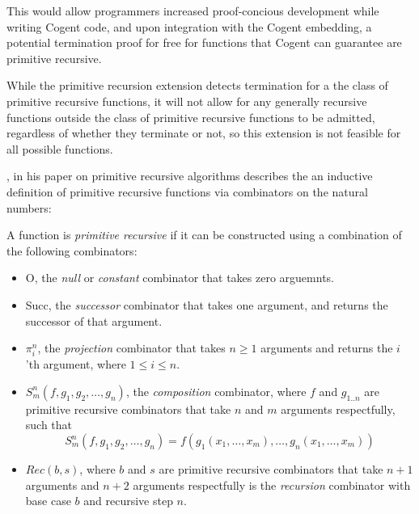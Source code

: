 This would allow programmers increased proof-concious development while writing Cogent code,
and upon integration with the Cogent embedding, a potential termination proof for free for
functions that Cogent can guarantee are primitive recursive.

While the primitive recursion extension detects termination for a the class of primitive recursive functions,
it will not allow for any generally recursive functions outside the class of primitive recursive functions to
be admitted, regardless of whether they terminate or not, so this extension is not feasible for all possible functions.

\citet{AboutPrimrecAlgorithms}, in his paper on primitive recursive algorithms describes the
an inductive definition of primitive recursive functions via combinators on the natural numbers:

\theoremstyle{definition}
\begin{definition}
    \label{def:primrec}
    A function is \textit{primitive recursive} if it can be constructed using 
    a combination of the following combinators:

    \begin{itemize}
        \item 
            \textsf{O}, the \textit{null} or \textit{constant} combinator that takes zero arguemnts.
        \item 
            \textsf{Succ}, the \textit{successor} combinator that takes one argument, and returns the successor
            of that argument.
        \item 
            \textsf{$\pi^n_i$}, the \textit{projection} combinator that takes $n \geq 1$ arguments and returns
            the $i$'th argument, where $1 \leq i \leq n$.
        \item 
            \textsf{$S^n_m(f, g_1, g_2, \dots, g_n)$}, the \textit{composition} combinator, where $f$ and $g_{1..n}$ are 
            primitive recursive combinators that take $n$ and $m$ arguments respectfully, such that 
                $$S^n_m(f, g_1, g_2, \dots, g_n) = f(g_1(x_1, \dots, x_m), \dots, g_n(x_1, \dots, x_m))$$
        \item 
            \textsf{$Rec(b,s)$}, where $b$ and $s$ are primitive recursive combinators that take
            $n + 1$ arguments and $n + 2$ arguments respectfully is the \textit{recursion}
            combinator with base case $b$ and recursive step $n$.
    \end{itemize}
\end{definition}

